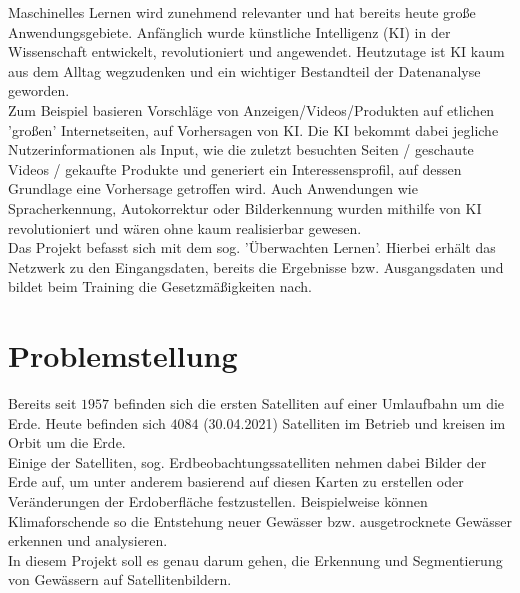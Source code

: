 Maschinelles Lernen wird zunehmend relevanter und hat bereits heute große Anwendungsgebiete.
Anfänglich wurde künstliche Intelligenz (KI) in der Wissenschaft entwickelt, revolutioniert und angewendet.
Heutzutage ist KI kaum aus dem Alltag wegzudenken und ein wichtiger Bestandteil der Datenanalyse geworden.
\\
Zum Beispiel basieren Vorschläge von Anzeigen/Videos/Produkten auf etlichen 'großen' Internetseiten, auf Vorhersagen von KI.
Die KI bekommt dabei jegliche Nutzerinformationen als Input, wie die zuletzt besuchten Seiten / geschaute Videos / gekaufte Produkte und generiert ein Interessensprofil, auf dessen Grundlage eine Vorhersage getroffen wird.
Auch Anwendungen wie Spracherkennung, Autokorrektur oder Bilderkennung wurden mithilfe von KI revolutioniert und wären ohne kaum realisierbar gewesen.
\\
%
Das Projekt befasst sich mit dem sog. 'Überwachten Lernen'.
Hierbei erhält das Netzwerk zu den Eingangsdaten, bereits die Ergebnisse bzw. Ausgangsdaten und bildet beim Training die Gesetzmäßigkeiten nach.

\section{Problemstellung}
Bereits seit $1957$ befinden sich die ersten Satelliten auf einer Umlaufbahn um die Erde.
Heute befinden sich $4084$ (30.04.2021) Satelliten im Betrieb und kreisen im Orbit um die Erde.\cite{ucsusa}
\\
Einige der Satelliten, sog. Erdbeobachtungssatelliten nehmen dabei Bilder der Erde auf, um unter anderem basierend auf diesen Karten zu erstellen oder Veränderungen der Erdoberfläche festzustellen.
Beispielweise können Klimaforschende so die Entstehung neuer Gewässer bzw. ausgetrocknete Gewässer erkennen und analysieren.
\\
In diesem Projekt soll es genau darum gehen, die Erkennung und Segmentierung von Gewässern auf Satellitenbildern.
\\

